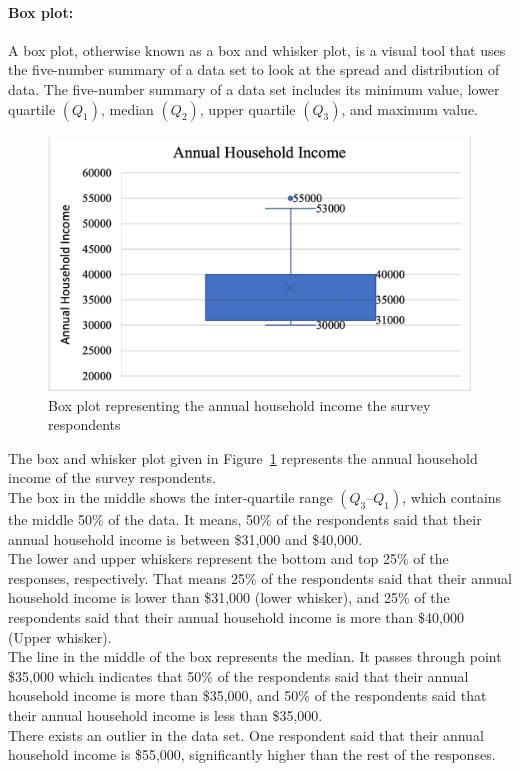 \documentclass[a4paper, 11pt]{article}
\begin{document}
	\paragraph{Box plot:} A box plot, otherwise known as a box and whisker plot, is a visual tool that uses the five-number summary of a data set to look at the spread and distribution of data. The five-number summary of a data set includes its minimum value, lower quartile $ (Q_1)$, median $(Q_2)$, upper quartile $(Q_3)$, and maximum value.\\[1ex]
	\begin{figure}[h!]
		\includegraphics[width=\linewidth]{Boxplot_new.jpg}
		\caption{Box plot representing the annual household income the survey respondents} 
		\label{fig:boxplot}
	\end{figure}
	The box and whisker plot given in Figure~\ref{fig:boxplot} represents the annual household income of the survey respondents.\\[1ex]
	The box in the middle shows the inter-quartile range $(Q_3 – Q_1)$, which contains the middle 50\% of the data. It means, 50\% of the respondents said that their annual household income is between \$31,000 and \$40,000.\\[1ex]	
	The lower and upper whiskers represent the bottom and top 25\% of the responses, respectively. That means 25\% of the respondents said that their annual household income is lower than \$31,000 (lower whisker), and 25\% of the respondents said that their annual household income is more than \$40,000 (Upper whisker).\\[1ex]
	The line in the middle of the box represents the median. It passes through point \$35,000 which indicates that 50\% of the respondents said that their annual household income is more than \$35,000, and 50\% of the respondents said that their annual household income is less than \$35,000.\\[1ex]
	There exists an outlier in the data set. One respondent said that their annual household income is \$55,000, significantly higher than the rest of the responses.
\end{document}

